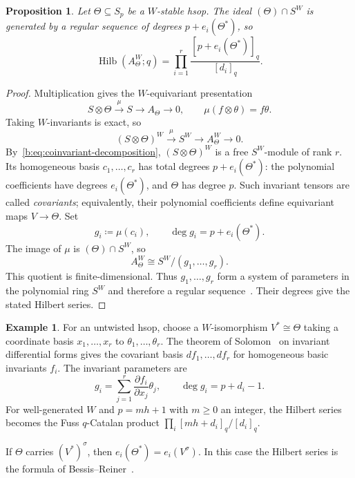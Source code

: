 \documentclass[10pt,a4paper]{amsart}
\newcommand{\defeq}{\coloneqq}
\newcommand{\defn}[1]{\emph{\color{darkblue}#1}}
\newtheorem{proposition}[theorem]{Proposition}
\theoremstyle{definition}
\newtheorem{example}[theorem]{Example}
\DeclareMathOperator{\Hilb}{Hilb}\DeclareMathOperator{\Res}{Res}
\begin{document}
\begin{proposition}\label{b:prop:invariant-parameters}
Let $\Theta\subseteq S_p$ be a $W$-stable hsop. The ideal
$(\Theta)\cap S^W$ is generated by a regular sequence of degrees
$p+e_i(\Theta^*)$, so
\begin{equation}\label{b:eq:invariant-parameter-hilbert}
 \Hilb(A_\Theta^W;q)
 =\prod_{i=1}^r\frac{[p+e_i(\Theta^*)]_q}{[d_i]_q}.
\end{equation}
\end{proposition}
\begin{proof}
Multiplication gives the $W$-equivariant presentation
\[
 S\otimes\Theta\xrightarrow{\ \mu\ }S
 \longrightarrow A_\Theta\longrightarrow0,
 \qquad \mu(f\otimes\theta)=f\theta.
\]
Taking $W$-invariants is exact, so
\[
 (S\otimes\Theta)^W\xrightarrow{\ \mu\ }S^W
 \longrightarrow A_\Theta^W\longrightarrow0.
\]
By~\cref{b:eq:coinvariant-decomposition}, $(S\otimes\Theta)^W$
is a free $S^W$-module of rank $r$. Its homogeneous basis
$c_1,\ldots,c_r$ has total degrees $p+e_i(\Theta^*)$: the polynomial
coefficients have degrees $e_i(\Theta^*)$, and $\Theta$ has degree $p$.
Such invariant tensors are called \defn{covariants}; equivalently,
their polynomial coefficients define equivariant maps $V\to\Theta$.
Set
\[
 g_i\defeq\mu(c_i),\qquad \deg g_i=p+e_i(\Theta^*).
\]
The image of $\mu$ is $(\Theta)\cap S^W$, so
\[
 A_\Theta^W\cong S^W/(g_1,\ldots,g_r).
\]
This quotient is finite-dimensional. Thus $g_1,\ldots,g_r$ form a
system of parameters in the polynomial ring $S^W$ and therefore a
regular sequence~\cite[Lemmas~10.104.2 and~10.104.7]{Stacks}.
Their degrees give the stated Hilbert series.
\end{proof}

\begin{example}\label{ex:invariant-parameters}
For an untwisted hsop, choose a $W$-isomorphism $V^*\cong\Theta$
taking a coordinate basis $x_1,\ldots,x_r$ to
$\theta_1,\ldots,\theta_r$. The theorem of Solomon~\cite[Theorem~2.3]{AW}
on invariant differential forms gives the covariant basis
$df_1,\ldots,df_r$ for homogeneous basic invariants $f_i$.
The invariant parameters are
\[
 g_i=\sum_{j=1}^r\frac{\partial f_i}{\partial x_j}\theta_j,
 \qquad \deg g_i=p+d_i-1.
\]
For well-generated $W$ and $p=mh+1$ with $m\ge0$ an integer,
the Hilbert series becomes the
Fuss $q$-Catalan product $\prod_i[mh+d_i]_q/[d_i]_q$.
\end{example}

If $\Theta$ carries $(V^*)^\sigma$, then
$e_i(\Theta^*)=e_i(V^\sigma)$. In this case the Hilbert series is
the formula of Bessis--Reiner~\cite[Proposition~4.2]{BR}.
\end{document}

